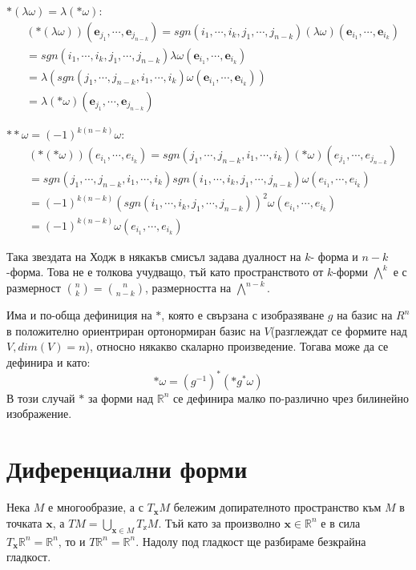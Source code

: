 \documentclass[12pt]{article}
\begin{document}
\begin{large}
$\ast (\lambda\omega) = \lambda(\ast\omega)$:
\begin{align*}
  &(\ast (\lambda\omega))(\mathbf{e}_{j_1},\cdots, \mathbf{e}_{j_{n-k}}) = sgn(i_1,\cdots,i_k,j_1,\cdots,j_{n-k}) (\lambda\omega)(\mathbf{e}_{i_1},\cdots,\mathbf{e}_{i_k}) \\
  &=sgn(i_1,\cdots,i_k,j_1,\cdots,j_{n-k})\lambda\omega(\mathbf{e}_{i_1},\cdots,\mathbf{e}_{i_k}) \\
  &=\lambda(sgn(j_1,\cdots,j_{n-k},i_1,\cdots,i_k)\omega(\mathbf{e}_{i_1},\cdots,\mathbf{e}_{i_k})) \\
  &=\lambda(\ast \omega)(\mathbf{e}_{j_1},\cdots, \mathbf{e}_{j_{n-k}})
\end{align*}

$\ast \ast \omega = (-1)^{k(n-k)} \omega$:
\begin{align*}
  &(\ast (\ast \omega))(e_{i_1},\cdots,e_{i_k})=sgn(j_1,\cdots,j_{n-k},i_1,\cdots,i_k)(\ast \omega)(e_{j_1},\cdots, e_{j_{n-k}}) \\
  &=sgn(j_1,\cdots,j_{n-k},i_1,\cdots,i_k) sgn(i_1,\cdots,i_k,j_1,\cdots,j_{n-k})\omega(e_{i_1},\cdots,e_{i_k}) \\
  &=(-1)^{k(n-k)}(sgn(i_1,\cdots,i_k,j_1,\cdots,j_{n-k}))^2\omega(e_{i_1},\cdots,e_{i_k}) \\
  &=(-1)^{k(n-k)}\omega(e_{i_1},\cdots,e_{i_k})
  \end{align*}

Така звездата на Ходж в някакъв смисъл задава дуалност на $k$- форма и $n-k$-форма. Това не е толкова учудващо, тъй като пространството от $k$-форми ${\bigwedge}^k$ е с размерност $\binom{n}{k}=\binom{n}{n-k}$, размерността на  ${\bigwedge}^{n-k}$.

Има и по-обща дефиниция на $\ast$, която е свързана с изобразяване $g$ на базис на $R^n$ в положително ориентриран ортонормиран базис на $V$(разглеждат се формите над $V, dim(V)=n$), относно някакво скаларно произведение. Тогава може да се дефинира и като:
\[
  \ast \omega = (g^{-1})^*(\ast g^* \omega)
\]
В този случай $\ast$  за форми над $\mathbb{R}^n$ се дефинира малко по-различно чрез билинейно изображение.

\section{Диференциални форми}
Нека $M$ е многообразие, а с $T_{\mathbf{x}}M$ бележим допирателното пространство към $M$ в точката ${\mathbf{x}}$, а $TM=\bigcup_{{\mathbf{x}} \in M}T_\mathbb{x} M$. Тъй като за произволно ${\mathbf{x}} \in \mathbb{R}^n$ е в сила $T_{\mathbf{x}} \mathbb{R}^n=\mathbb{R}^n$, то и $T\mathbb{R}^n=\mathbb{R}^n$.
Надолу под гладкост ще разбираме безкрайна гладкост.


\end{large}
\end{document}
